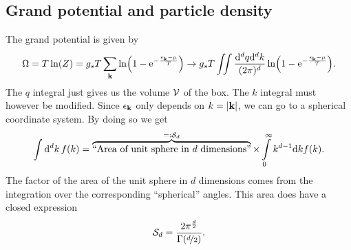 \documentclass[11pt,letter, swedish, english
]{article}
\begin{document}
\subsection{Grand potential and particle density}
The grand potential is given by
\begin{equation}
\Omega=T\ln(Z)=g_sT\sum_{\vb{k}}
\ln(1-\mathrm{e}^{-\frac{\epsilon_{\vb{k}}-\mu}{T}})
\to g_sT
\iint\frac{\mathrm{d}^dq\mathrm{d}^dk}{(2\pi)^d}\ln(1-\mathrm{e}^{-\frac{\epsilon_{\vb{k}}-\mu}{T}}).
\end{equation}
The $q$ integral just gives us the volume $\mathcal{V}$ of the box. The $k$
integral must however be modified. Since $\epsilon_{\vb{k}}$ only
depends on $k=|\vb{k}|$, we can go to a spherical coordinate
system. By doing so we get
\vspace{-4mm}\begin{equation}
\int\rd^dk\,f(k)
=\overbrace{\text{``Area of unit sphere in $d$ dimensions''}}^{=:\Sd}
\times\int_0^\infty k^{d-1}\rd{k}f(k).
\end{equation}
The factor of the area of the unit sphere in $d$ dimensions comes from
the integration over the corresponding ``spherical'' angles. This area
does have a closed expression
\begin{equation}\label{eq:4_Sd}
\mathcal{S}_d=\frac{2\pi^{\frac{d}{2}}}{\Gamma(\nicefrac{d}{2})}.
\end{equation}
\end{document}
